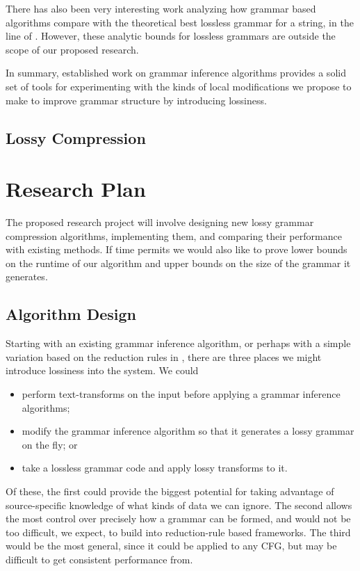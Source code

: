 \documentclass[11pt]{article}
\begin{document}
There has also been very interesting work analyzing how grammar based
algorithms compare with the theoretical best lossless grammar for a string, in
the line of \cite{approximation}.  However, these analytic bounds for lossless
grammars are outside the scope of our proposed research.

In summary, established work on grammar inference algorithms provides a solid
set of tools for experimenting with the kinds of local modifications we propose
to make to improve grammar structure by introducing lossiness.

\subsection{Lossy Compression}

\section{Research Plan}

The proposed research project will involve designing new lossy grammar
compression algorithms, implementing them, and comparing their performance with
existing methods.  If time permits we would also like to prove lower bounds on
the runtime of our algorithm and upper bounds on the size of the grammar it
generates.

\subsection{Algorithm Design}

Starting with an existing grammar inference algorithm, or perhaps with a simple
variation based on the reduction rules in \cite{grammarcodes}, there are three
places we might introduce lossiness into the system.  We could
\begin{itemize}
  \item perform text-transforms on the input before applying a grammar
    inference algorithms;
  \item modify the grammar inference algorithm so that it generates a lossy
    grammar on the fly; or
  \item take a lossless grammar code and apply lossy transforms to it.
\end{itemize}
Of these, the first could provide the biggest potential for taking advantage of
source-specific knowledge of what kinds of data we can ignore.  The second
allows the most control over precisely how a grammar can be formed, and would
not be too difficult, we expect, to build into reduction-rule based frameworks.
The third would be the most general, since it could be applied to any CFG, but
may be difficult to get consistent performance from.
\end{document}
